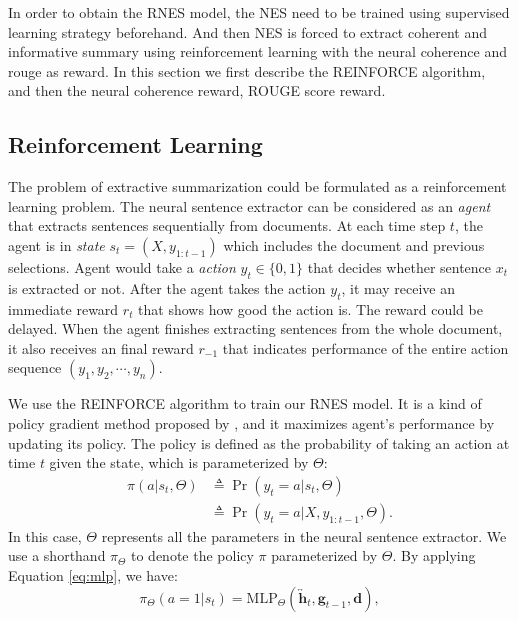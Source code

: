\documentclass[letterpaper]{article} %
\begin{document}
    In order to obtain the RNES model, the NES need to be trained using supervised learning strategy beforehand. And then NES  is forced to extract coherent and informative summary using reinforcement learning with the neural coherence and rouge as reward.  In this section we first describe the REINFORCE algorithm, and then the neural coherence reward, ROUGE score reward.

	\subsection{Reinforcement Learning} 

	The problem of extractive summarization could be formulated as a reinforcement learning problem. The neural sentence extractor can be considered as an \emph{agent} that extracts sentences sequentially from documents. At each time step $t$, the agent is in \emph{state} $s_t = (X, y_{1:t-1})$ which includes the document and previous selections. Agent would take a \emph{action} $y_t \in \{0,1\}$ that decides whether sentence $x_t$ is extracted or not. After the agent takes the action $y_t$, it may receive an immediate reward $r_{t}$ that shows how good the action is. The reward could be delayed. When the agent finishes extracting sentences from the whole document, it also receives an final reward $r_{-1}$ that indicates performance of the entire action sequence $(y_1, y_2, \cdots, y_n)$.
	
	We use the REINFORCE algorithm to train our RNES model. It is a kind of policy gradient method proposed by \cite{williams_simple_1992}, and it maximizes agent's performance by updating its policy. The policy is defined as the probability of taking an action at time $t$ given the state, which is parameterized by $\Theta$:
	\begin{align}
	\pi(a|s_t,\Theta) &\triangleq \Pr(y_t=a|s_t,\Theta) \\
	&\triangleq \Pr(y_t=a|X, y_{1:t-1}, \Theta) .
	\end{align}
	In this case, $\Theta$ represents all the parameters in the neural sentence extractor. We use a shorthand $\pi_{\Theta}$ to denote the policy $\pi$ parameterized by $\Theta$. By applying Equation \ref{eq:mlp}, we have:
	\begin{equation}
	\pi_{\Theta}(a=1|s_t) = \text{MLP}_{\Theta}(\overleftrightarrow{\mathbf{h}}_t, \mathbf{g}_{t-1}, \mathbf{d} ) ,
	\end{equation}
	
\end{document}

